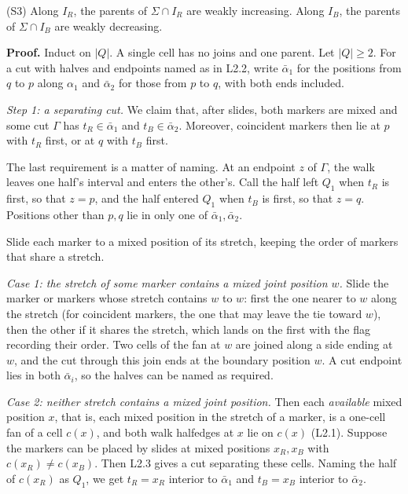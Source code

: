 \documentclass[
  11pt,
]{article}
\begin{document}
(S3) Along \(I_R\), the parents of \(\Sigma\cap I_R\) are weakly
increasing. Along \(I_B\), the parents of \(\Sigma\cap I_B\) are weakly
decreasing.

\textbf{Proof.} Induct on \(|Q|\). A single cell has no joins and one
parent. Let \(|Q|\ge2\). For a cut with halves and endpoints named as in
L2.2, write \(\bar\alpha_1\) for the positions from \(q\) to \(p\) along
\(\alpha_1\) and \(\bar\alpha_2\) for those from \(p\) to \(q\), with
both ends included.

\emph{Step 1: a separating cut.} We claim that, after slides, both
markers are mixed and some cut \(\Gamma\) has \(t_R\in\bar\alpha_1\) and
\(t_B\in\bar\alpha_2\). Moreover, coincident markers then lie at \(p\)
with \(t_R\) first, or at \(q\) with \(t_B\) first.

The last requirement is a matter of naming. At an endpoint \(z\) of
\(\Gamma\), the walk leaves one half's interval and enters the other's.
Call the half left \(Q_1\) when \(t_R\) is first, so that \(z=p\), and
the half entered \(Q_1\) when \(t_B\) is first, so that \(z=q\).
Positions other than \(p,q\) lie in only one of
\(\bar\alpha_1,\bar\alpha_2\).

Slide each marker to a mixed position of its stretch, keeping the order
of markers that share a stretch.

\emph{Case 1: the stretch of some marker contains a mixed joint position
\(w\).} Slide the marker or markers whose stretch contains \(w\) to
\(w\): first the one nearer to \(w\) along the stretch (for coincident
markers, the one that may leave the tie toward \(w\)), then the other if
it shares the stretch, which lands on the first with the flag recording
their order. Two cells of the fan at \(w\) are joined along a side
ending at \(w\), and the cut through this join ends at the boundary
position \(w\). A cut endpoint lies in both \(\bar\alpha_i\), so the
halves can be named as required.

\emph{Case 2: neither stretch contains a mixed joint position.} Then
each \emph{available} mixed position \(x\), that is, each mixed position
in the stretch of a marker, is a one-cell fan of a cell \(c(x)\), and
both walk halfedges at \(x\) lie on \(c(x)\) (L2.1). Suppose the markers
can be placed by slides at mixed positions \(x_R,x_B\) with
\(c(x_R)\ne c(x_B)\). Then L2.3 gives a cut separating these cells.
Naming the half of \(c(x_R)\) as \(Q_1\), we get \(t_R=x_R\) interior to
\(\bar\alpha_1\) and \(t_B=x_B\) interior to \(\bar\alpha_2\).
\end{document}
